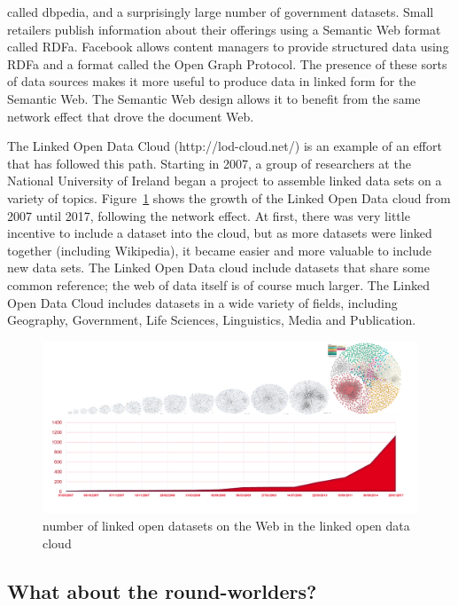 called dbpedia, and a surprisingly large number of government datasets.
Small retailers publish information about their offerings using a
Semantic Web format called RDFa. Facebook allows content managers to
provide structured data using RDFa and a format called the Open Graph
Protocol. The presence of these sorts of data sources makes it more
useful to produce data in linked form for the Semantic Web. The Semantic
Web design allows it to benefit from the same network effect that drove
the document Web.

The Linked Open Data Cloud (http://lod-cloud.net/) is an example of an
effort that has followed this path. Starting in 2007, a group of
researchers at the National University of Ireland began a project to
assemble linked data sets on a variety of topics. Figure~\ref{fig:ch1.1} shows the
growth of the Linked Open Data cloud from 2007 until 2017, following the
network effect. At first, there was very little incentive to include a
dataset into the cloud, but as more datasets were linked together
(including Wikipedia), it became easier and more valuable to include new
data sets. The Linked Open Data cloud include datasets that share some
common reference; the web of data itself is of course much larger. The
Linked Open Data Cloud includes datasets in a wide variety of fields,
including Geography, Government, Life Sciences, Linguistics, Media and
Publication.

\begin{figure}
    \centering
    \includegraphics[width=5.0in]{media/image1.png}
    \caption{number of linked open datasets on the Web in the linked open
data cloud}
    \label{fig:ch1.1}
\end{figure}


\subsection{What about the round-worlders?}

